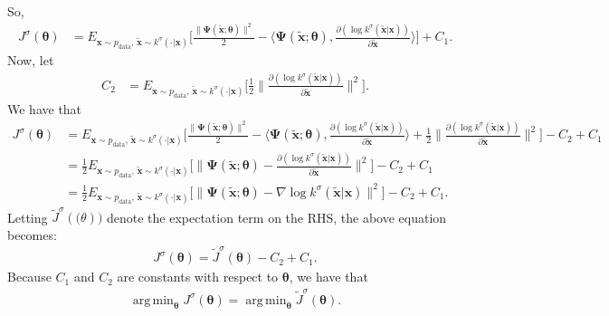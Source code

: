 \documentclass[10pt]{article}
\newcommand{\ve}[1]{\mathbf{#1}}
\newcommand{\mrm}[1]{\mathrm{#1}}
\newcommand{\ves}[1]{\boldsymbol{#1}}
\DeclareMathOperator*{\argmin}{arg\,min}
\begin{document}
\begin{itemize}
\begin{align*}
  \end{align*}
  So,
  \begin{align*}
    J^\sigma(\ves{\theta}) 
    &= E_{\ve{x}\sim p_{\mrm{data}},\, \widetilde{\ve{x}} \sim k^\sigma(\cdot|\ve{x})} \bigg[
      \frac{\| \ves{\Psi}(\widetilde{\ve{x}};\ves{\theta}) \|^2}{2}
      - \bigg\langle \ves{\Psi}(\widetilde{\ve{x}};\ves{\theta}),  \frac{\partial (\log k^\sigma(\widetilde{\ve{x}}|\ve{x})) }{\partial \widetilde{\ve{x}}} \bigg\rangle \bigg] + C_1.
  \end{align*}
  Now, let
  \begin{align*}
    C_2 
    &= E_{\ve{x}\sim p_{\mrm{data}},\, \widetilde{\ve{x}} \sim k^\sigma(\cdot|\ve{x})} \bigg[ \frac{1}{2} \bigg\| \frac{\partial (\log k^\sigma(\widetilde{\ve{x}}|\ve{x})) }{\partial \widetilde{\ve{x}}} \bigg\|^2 \bigg].
  \end{align*}
  We have that
  \begin{align*}
    J^\sigma(\ves{\theta}) 
    &= E_{\ve{x}\sim p_{\mrm{data}},\, \widetilde{\ve{x}} \sim k^\sigma(\cdot|\ve{x})} \bigg[
      \frac{\| \ves{\Psi}(\widetilde{\ve{x}};\ves{\theta}) \|^2}{2}
      - \bigg\langle \ves{\Psi}(\widetilde{\ve{x}};\ves{\theta}),  \frac{\partial (\log k^\sigma(\widetilde{\ve{x}}|\ve{x})) }{\partial \widetilde{\ve{x}}} \bigg\rangle + \frac{1}{2} \bigg\| \frac{\partial (\log k^\sigma(\widetilde{\ve{x}}|\ve{x})) }{\partial \widetilde{\ve{x}}} \bigg\|^2 \bigg] - C_2 + C_1 \\
    &= \frac{1}{2} E_{\ve{x}\sim p_{\mrm{data}},\, \widetilde{\ve{x}} \sim k^\sigma(\cdot|\ve{x})} \bigg[ \bigg\| \ves{\Psi}(\widetilde{\ve{x}};\ves{\theta}) - \frac{\partial (\log k^\sigma(\widetilde{\ve{x}}|\ve{x})) }{\partial \widetilde{\ve{x}}} \bigg\|^2 \bigg] - C_2 + C_1 \\
    &= \frac{1}{2} E_{\ve{x}\sim p_{\mrm{data}},\, \widetilde{\ve{x}} \sim k^\sigma(\cdot|\ve{x})} \Big[ \Big\| \ves{\Psi}(\widetilde{\ve{x}};\ves{\theta}) - \nabla \log k^\sigma(\widetilde{\ve{x}}|\ve{x}) \Big\|^2 \Big] - C_2 + C_1.
  \end{align*}
  Letting $\widetilde{J}^\sigma(\ves(\theta))$ denote the expectation term on the RHS, the above equation becomes:
  \begin{align} \label{eqn:j-tilde}
    J^\sigma(\ves{\theta}) = \widetilde{J}^\sigma(\ves{\theta}) - C_2 + C_1. 
  \end{align}
  Because $C_1$ and $C_2$ are constants with respect to $\ves{\theta}$, we have that
  \begin{align*}
    \argmin_{\ves{\theta}} J^\sigma(\ves{\theta}) = \argmin_{\ves{\theta}} \widetilde{J}^\sigma(\ves{\theta}).
  \end{align*}


\end{itemize}
\end{document}
